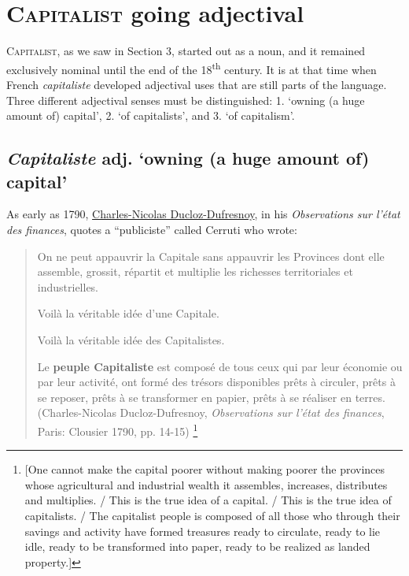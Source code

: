 \documentclass[output=paper]{langsci/langscibook}
\begin{document}
\section{\textsc{Capitalist} going adjectival}

\textsc{Capitalist}, as we saw in Section 3, started out as a noun, and
it remained exclusively nominal until the end of the
18\textsuperscript{th} century. It is at that time when French
\emph{capitaliste} developed adjectival uses that are still parts of the
language. Three different adjectival senses must be distinguished: 1.
`owning (a huge amount of) capital', 2. `of capitalists', and 3. `of
capitalism'.

\subsection{\emph{Capitaliste} adj. `owning (a huge amount of) capital'}

As early as 1790,
\href{https://www.google.at/search?hl=de\&tbo=p\&tbm=bks\&q=inauthor:\%22Charles
-Nicolas+Ducloz-Dufresnoy\%22}{
Charles-Nicolas Ducloz-Dufresnoy}, in his \emph{Observations sur
l'état des finances}, quotes a
``publiciste'' called Cerruti who wrote:

\begin{quotation}
On ne peut appauvrir la Capitale sans appauvrir les Provinces dont elle
assemble, grossit, répartit et multiplie les richesses territoriales et
industrielles.

Voilà la véritable idée d'une Capitale.

Voilà la véritable idée des Capitalistes.

Le \textbf{peuple Capitaliste} est composé de tous ceux qui par leur
économie ou par leur activité, ont formé des trésors disponibles prêts à
circuler, prêts à se reposer, prêts à se transformer en papier, prêts à
se réaliser en terres.
  (Charles-Nicolas Ducloz-Dufresnoy, \emph{Observations sur
l'état des finances}, Paris: Clousier 1790, pp. 14-15)%
\footnote{{[}One cannot make the capital poorer
  without making poorer the provinces whose agricultural and industrial
  wealth it assembles, increases, distributes and multiplies. / This is
  the true idea of a capital. / This is the true idea of capitalists. /
  The capitalist people is composed of all those who through their
  savings and activity have formed treasures ready to circulate, ready
  to lie idle, ready to be transformed into paper, ready to be realized
  as landed property.{]}}
\end{quotation}
\end{document}
